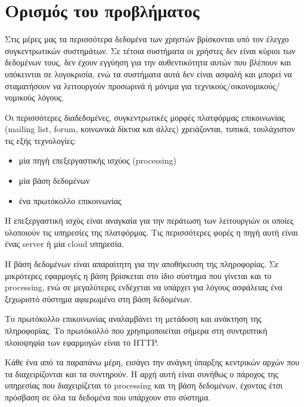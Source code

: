 \section{Ορισμός του προβλήματος}

Στις μέρες μας τα περισσότερα δεδομένα των χρηστών βρίσκονται υπό τον έλεγχο συγκεντρωτικών συστημάτων. Σε τέτοια συστήματα οι χρήστες δεν είναι κύριοι των δεδομένων τους, δεν έχουν εγγύηση για την αυθεντικότητα αυτών που βλέπουν και υπόκεινται σε λογοκρισία, ενώ τα συστήματα αυτά δεν είναι ασφαλή και μπορεί να σταματήσουν να λειτουργούν προσωρινά ή μόνιμα για τεχνικούς/οικονομικούς/νομικούς λόγους.

Οι περισσότερες διαδεδομένες, συγκεντρωτικές μορφές πλατφόρμας επικοινωνίας (mailing list, forum, κοινωνικά δίκτυα και άλλες) χρειάζονται, τυπικά, τουλάχιστον τις εξής τεχνολογίες:

\begin{itemize}
	\item μία πηγή επεξεργαστικής ισχύος (processing)
	\item μία βάση δεδομένων
	\item ένα πρωτόκολλο επικοινωνίας
\end{itemize}

Η επεξεργαστική ισχύς είναι αναγκαία για την περάτωση των λειτουργιών οι οποίες υλοποιούν τις υπηρεσίες της πλατφόρμας. Τις περισσότερες φορές η πηγή αυτή είναι ένας server ή μία cloud υπηρεσία.

Η βάση δεδομένων είναι απαραίτητη για την αποθήκευση της πληροφορίας. Σε μικρότερες εφαρμογές η βάση βρίσκεται στο ίδιο σύστημα που γίνεται και το processing, ενώ σε μεγαλύτερες ενδέχεται να υπάρχει για λόγους ασφάλειας ένα ξεχωριστό σύστημα αφιερωμένο στη βάση δεδομένων.

Το πρωτόκολλο επικοινωνίας αναλαμβάνει τη μετάδοση και ανάκτηση της πληροφορίας. Το πρωτόκολλό που χρησιμοποιείται σήμερα στη συντριπτική πλοιοψηφία των εφαρμογών είναι το HTTP.

Κάθε ένα από τα παραπάνω μέρη, εισάγει την ανάγκη ύπαρξης κεντρικών αρχών που τα διαχειρίζονται και τα συντηρούν. Η αρχή αυτή είναι συνήθως ο πάροχος της υπηρεσίας που διαχειρίζεται το processing και τη βάση δεδομένων, έχοντας έτσι πρόσβαση σε όλα τα δεδομένα που υπάρχουν στο σύστημα.
